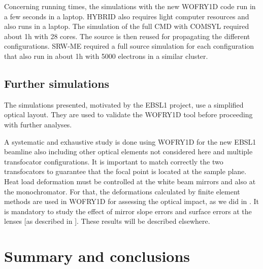 \documentclass{iucr}              %
\begin{document}
Concerning running times, the simulations with the new WOFRY1D code run in a few seconds in a laptop.
HYBRID also requires light computer resources and also runs in a laptop. 
The simulation of the full CMD with COMSYL required about 1h with 28 cores. The source is then reused for propagating the different configurations. SRW-ME required a full source simulation for each configuration that also run in about 1h with 5000 electrons in a similar cluster. 


\subsection{Further simulations}
\label{sec:discussion}

The simulations presented, motivated by the EBSL1 project, use a simplified optical layout. They are used to validate the WOFRY1D tool before proceeding with further analyses. 

A systematic and exhaustive study is done using WOFRY1D for the new EBSL1 beamline also including other optical elements not considered here and multiple transfocator configurations. It is important to match correctly the two transfocators to guarantee that the focal point is located at the sample plane. Heat load deformation must be controlled at the white beam mirrors and also at the monochromator. For that, the deformations calculated by finite element methods are used in WOFRY1D for assessing the optical impact, as we did in \cite{srioLBL}. It is mandatory to study the effect of mirror slope errors and surface errors at the lenses [as described in \cite{Celestre:mo5214}]. These results will be described elsewhere.


\section{Summary and conclusions}
\label{sec:summary}
\end{document}
